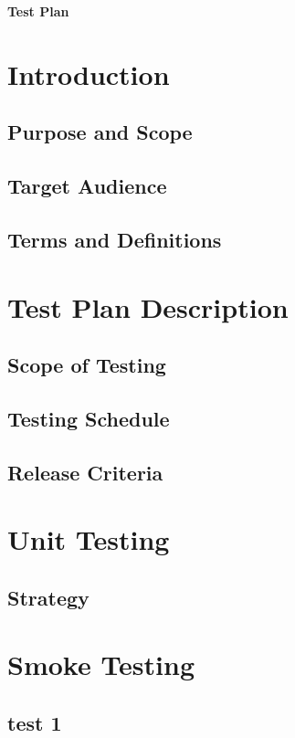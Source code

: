 \documentclass{article}
\renewcommand{\maketitle}{
   \begin{center}
      {\Huge \bfseries Test Plan}
   \end{center}
}
\begin{document}
\maketitle
\tableofcontents

\section{Introduction}
\subsection{Purpose and Scope}
\subsection{Target Audience}
\subsection{Terms and Definitions}

\section{Test Plan Description}
\subsection{Scope of Testing}
\subsection{Testing Schedule}
\subsection{Release Criteria}

\section{Unit Testing}
\subsection{Strategy}

\section{Smoke Testing}
\subsection{test 1}
\end{document}
